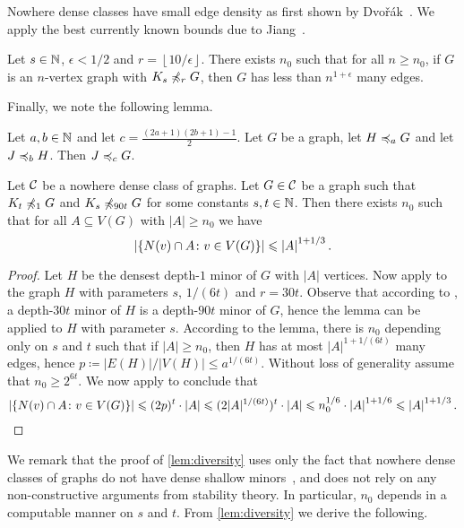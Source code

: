 Nowhere dense classes have small edge density as
first shown by Dvo\v{r}\'ak~\cite{dvorak2007asymptotical}. 
We apply the best currently known bounds due to 
Jiang~\cite{jiang2011compact}. 

\begin{lemma}\label{lem:densityjiang}
Let $s\in\mathbb{N}$, $\epsilon<1/2$ and $r=\left\lfloor 10/\epsilon\right\rfloor$. There exists 
$n_0$ such that for all $n\geq n_0$, if $G$ is an 
$n$-vertex graph with $K_s\not\preccurlyeq_rG$, 
then $G$ has less than $n^{1+\epsilon}$ many edges. 
\end{lemma}

Finally, we note the following lemma. 

\begin{lemma}\label{lem:combineminors}
Let $a,b\in \mathbb{N}$ and let $c=\frac{(2a+1)(2b+1)-1}{2}$. 
Let $G$ be a graph, let $H\preccurlyeq_aG$ and let 
$J\preccurlyeq_bH$. Then $J\preccurlyeq_cG$. 
\end{lemma}

\begin{corollary}\label{lem:diversity}
Let $\mathcal{C}$ be a nowhere dense class of graphs. 
Let $G\in \mathcal{C}$ be a graph such that $K_t\not\preccurlyeq_1G$ 
and $K_s\not\preccurlyeq_{90t}G$ for
some constants $s,t\in\mathbb{N}$. Then 
there exists $n_0$ such that for all $A\subseteq V(G)$ 
with $|A|\geq n_0$ we have 
\[\left\lvert\{N(v)\cap A \colon v\in V(G)\}\right\rvert\leqslant\left\lvert A\right\rvert^{1+1/3}.\]
\end{corollary}
\begin{proof}
Let $H$ be the densest depth-$1$ minor of $G$ with 
$|A|$ vertices. Now apply 
to the graph $H$ with parameters $s$, $1/(6t)$ and $r=30t$.
Observe that according to , 
a depth-$30t$ minor of $H$ is a depth-$90t$ minor 
of $G$, hence the lemma can be applied to $H$ with 
parameter $s$. According to the lemma, there is 
$n_0$ depending only on $s$ and $t$ such that 
if $|A|\geq n_0$, then $H$ has at most $|A|^{1+1/(6t)}$
many edges, hence $p\coloneqq |E(H)|/|V(H)|\leq a^{1/(6t)}$. Without loss of generality assume 
that $n_0\geq 2^{6t}$. 
We now apply  to conclude that
\[\left\lvert\{N(v)\cap A \colon v\in V(G)\}\right\rvert\leqslant(2p)^t\cdot \left\lvert A\right\rvert\leqslant (2|A|^{1/(6t)})^t\cdot \left\lvert A\right\rvert\leqslant n_0^{1/6}\cdot \left\lvert A\right\rvert^{1+1/6}\leqslant \left\lvert A\right\rvert^{1+1/3}.\]
\end{proof}

We remark that the proof of \cref{lem:diversity} uses only the fact that
nowhere dense classes of graphs do not have dense 
shallow minors~\cite{dvorak2007asymptotical,jiang2011compact}, and does not rely on any non-constructive arguments from stability theory. In particular, $n_0$ depends in a computable manner on $s$ and $t$.
From \cref{lem:diversity} we derive the following.


